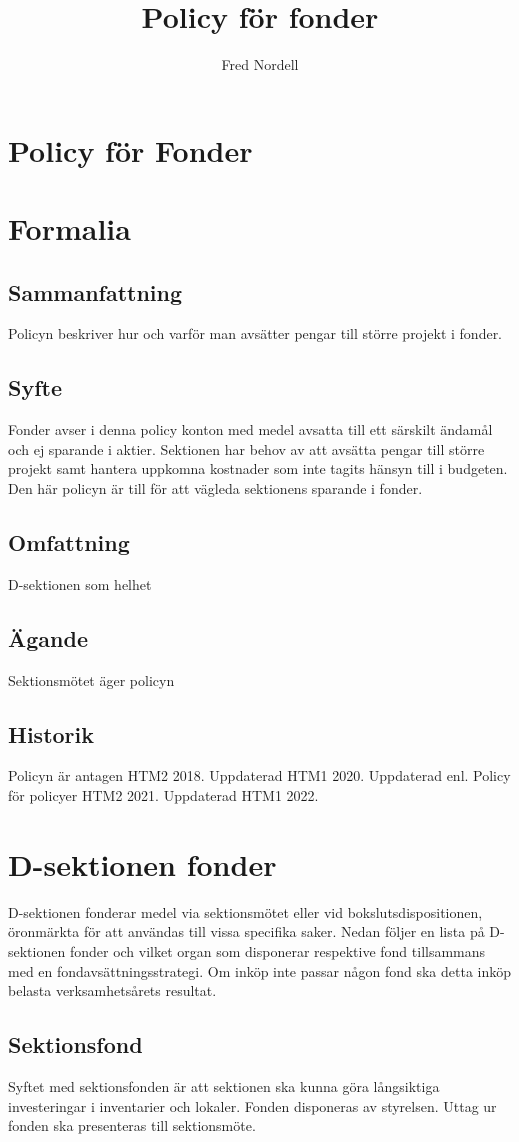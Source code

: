 \documentclass{dsekprotokoll}
\title{Policy för fonder}
\author{Fred Nordell}
\begin{document}
\section*{Policy för Fonder}
\section{Formalia}
\subsection{Sammanfattning}
Policyn beskriver hur och varför man avsätter pengar till större projekt i fonder.
\subsection{Syfte}
Fonder avser i denna policy konton med medel avsatta till ett särskilt ändamål och ej sparande i aktier. Sektionen har behov av att avsätta pengar till större projekt samt hantera uppkomna kostnader som inte tagits hänsyn till i budgeten. Den här policyn är till för att vägleda sektionens sparande i fonder.
\subsection{Omfattning}
D-sektionen som helhet
\subsection{Ägande}
Sektionsmötet äger policyn
\subsection{Historik}
Policyn är antagen HTM2 2018.
Uppdaterad HTM1 2020.
Uppdaterad enl. Policy för policyer HTM2 2021.
Uppdaterad HTM1 2022.

\section{D-sektionen fonder}
D-sektionen fonderar medel via sektionsmötet eller vid bokslutsdispositionen, öronmärkta för
att användas till vissa specifika saker. Nedan följer en lista på D-sektionen fonder och vilket organ som disponerar respektive fond tillsammans med en fondavsättningsstrategi. Om inköp inte passar
någon fond ska detta inköp belasta verksamhetsårets resultat.

\subsection{Sektionsfond}
Syftet med sektionsfonden är att sektionen ska kunna göra långsiktiga investeringar i inventarier och lokaler. Fonden disponeras av styrelsen. Uttag ur fonden ska presenteras
till sektionsmöte.
\end{document}
